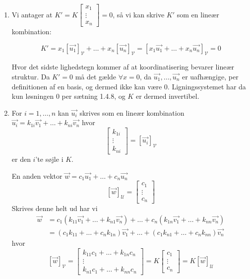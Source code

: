 \begin{bevis}
	\begin{enumerate}
		\item Vi antager at $K' = K\begin{bmatrix}x_1\\ \vdots 
			\\x_n\end{bmatrix} = 0$, så vi kan skrive $K'$ som en lineær 
			kombination:

			\[
				K' = x_1[\vec{u_1}]_{\mathcal{V}} + \ldots + 
					x_n[\vec{u_n}]_{\mathcal{V}} = [x_1\vec{u_1} + \ldots + 
					x_n\vec{u_n}]_{\mathcal{V}} = 0
			\]
			
			Hvor det sidste lighedstegn kommer af at koordinatisering bevarer
			lineær struktur.
			Da $K' = 0$ må det gælde $\forall x = 0$, da $\vec{u_1}, \ldots, 
			\vec{u_n}$ er uafhængige, per definitionen af en basis, og dermed 
			ikke kan være 0. 
			Ligningssystemet har da kun løsningen $0$ per sætning 1.4.8, og
			$K$ er dermed invertibel.
		\item For $i = 1,\dots,n$ kan $\vec{u_i}$ skrives som en lineær kombination
			$\vec{u_i} = k_{1i} \vec{v_1}+\dots + k_{ni} \vec{v_n}$ hvor
			\[
				\begin{bmatrix}
					k_{1i} \\
					\vdots \\
					k_{ni}
				\end{bmatrix} = [ \vec{u_i} ]_\mathcal{V}
			\]
			er den $i$'te søjle i $K$.

			En anden vektor $\vec{w} = c_1 \vec{u_1} + \dots + c_n \vec{u_n}$ 
			\[
				[ \vec{w} ]_\mathcal{U} = \begin{bmatrix}
					c_{1} \\
					\vdots \\
					c_{n}
				\end{bmatrix}
			\]
			Skrives denne helt ud har vi
			\begin{align*}
				\vec{w} &= c_1 (k_{11} \vec{v_1} + \dots + k_{n1} \vec{v_n}) + \dots + c_n
						(k_{1n} \vec{v_1} + \dots + k_{nn} \vec{v_n}) \\
					&= (c_1 k_{11} + \dots + c_n k_{1n}) \vec{v_1} + \dots + (c_1 k_{n1} +
						\dots + c_n k_{nn}) \vec{v_n}
			\end{align*}
			hvor
			\[
				[ \vec{w} ]_\mathcal{V} = \begin{bmatrix}
					k_{11} c_1 + \dots + k_{1n} c_n \\
					\vdots \\
					k_{n1} c_1 + \dots + k_{nn} c_n
				\end{bmatrix} = K \begin{bmatrix}
					c_1 \\
					\vdots \\
					c_n
				\end{bmatrix} = K[\vec{w}]_\mathcal{U}
			\]


\end{enumerate}
\end{bevis}
